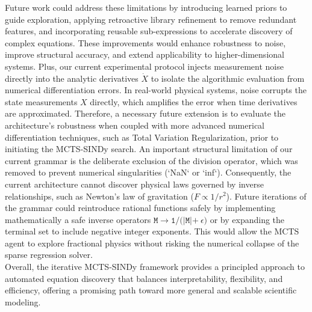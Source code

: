 \documentclass[11pt, a4paper]{article}
\begin{document}
Future work could address these limitations by introducing learned priors to guide exploration, applying retroactive library refinement to remove redundant features, and incorporating reusable sub-expressions to accelerate discovery of complex equations. These improvements would enhance robustness to noise, improve structural accuracy, and extend applicability to higher-dimensional systems. Plus, our current experimental protocol injects measurement noise directly into the analytic derivatives $\dot{X}$ to isolate the algorithmic evaluation from numerical differentiation errors. In real-world physical systems, noise corrupts the state measurements $X$ directly, which amplifies the error when time derivatives are approximated. Therefore, a necessary future extension is to evaluate the architecture's robustness when coupled with more advanced numerical differentiation techniques, such as Total Variation Regularization, prior to initiating the MCTS-SINDy search. An important structural limitation of our current grammar is the deliberate exclusion of the division operator, which was removed to prevent numerical singularities (`NaN` or `inf`). Consequently, the current architecture cannot discover physical laws governed by inverse relationships, such as Newton's law of gravitation ($F \propto 1/r^2$). Future iterations of the grammar could reintroduce rational functions safely by implementing mathematically a safe inverse operators  $\texttt{M} \rightarrow \texttt{1/(|M|+}\ \epsilon \texttt{)} $  or by expanding the terminal set to include negative integer exponents. This would allow the MCTS agent to explore fractional physics without risking the numerical collapse of the sparse regression solver.\\

Overall, the iterative MCTS-SINDy framework provides a principled approach to automated equation discovery that balances interpretability, flexibility, and efficiency, offering a promising path toward more general and scalable scientific modeling.



\newpage


\end{document}
